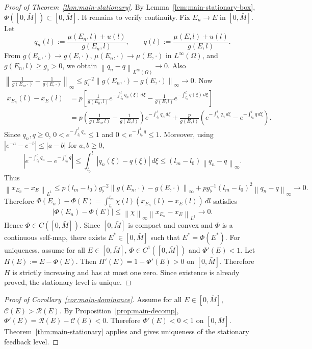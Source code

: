 \documentclass[pdflatex,sn-mathphys-num]{sn-jnl}
\theoremstyle{thmstyleone}
\theoremstyle{definition}
\theoremstyle{remark}
\newcommand{\Om}{\Omega}
\newcommand{\Rcal}{\mathcal{R}}
\newcommand{\Ccal}{\mathcal{C}}
\newcommand{\norm}[1]{\left\lVert#1\right\rVert}
\newcommand{\abs}[1]{\left\lvert#1\right\rvert}
\numberwithin{equation}{section}
\begin{document}
\begin{proof}[Proof of Theorem~\ref{thm:main-stationary}]
By Lemma~\ref{lem:main-stationary-box},
$\displaystyle 
\Phi([0,\bar M])\subset[0,\bar M]$.
It remains to verify continuity. Fix \(E_n\to E\) in \([0,\bar M]\). Let
\[
q_n(l):=\frac{\mu(E_n,l)+u(l)}{g(E_n,l)},
\qquad
q(l):=\frac{\mu(E,l)+u(l)}{g(E,l)} .
\]
From
$g(E_n,\cdot)\to g(E,\cdot)$,
$\mu(E_n,\cdot)\to\mu(E,\cdot)$ in $L^\infty(\Om)$,
and
$g(E_n,l)\ge g_\flat>0$,
we obtain
$\displaystyle 
\norm{q_n-q}_{L^\infty(\Om)}\to0$.
Also
$\displaystyle 
\left\|
\frac{1}{g(E_n,\cdot)}-\frac{1}{g(E,\cdot)}
\right\|_{\infty}
\le
g_\flat^{-2}
\norm{g(E_n,\cdot)-g(E,\cdot)}_{\infty}
\to0$.
Now
\[
\begin{aligned}
x_{E_n}(l)-x_E(l)
&=
p\left[
\frac{1}{g(E_n,l)}e^{-\int_{l_0}^{l}q_n(\xi)\,d\xi}
-
\frac{1}{g(E,l)}e^{-\int_{l_0}^{l}q(\xi)\,d\xi}
\right] \\[4pt]
&=
p\left(\frac{1}{g(E_n,l)}-\frac{1}{g(E,l)}\right)
e^{-\int_{l_0}^{l}q_n\,d\xi}
+
\frac{p}{g(E,l)}
\left(
e^{-\int_{l_0}^{l}q_n\,d\xi}
-
e^{-\int_{l_0}^{l}q\,d\xi}
\right).
\end{aligned}
\]
Since \(q_n,q\ge0\), $0<e^{-\int_{l_0}^{l}q_n}\le1$ and 
$0<e^{-\int_{l_0}^{l}q}\le1$.
Moreover, using \(|e^{-a}-e^{-b}|\le |a-b|\) for \(a,b\ge0\),
\[
\left|
e^{-\int_{l_0}^{l}q_n}
-
e^{-\int_{l_0}^{l}q}
\right|
\le
\int_{l_0}^{l}\abs{q_n(\xi)-q(\xi)}\,d\xi
\le
(l_m-l_0)\norm{q_n-q}_{\infty}.
\]
Thus
\[
\norm{x_{E_n}-x_E}_{L^1}
\le
p(l_m-l_0)
g_\flat^{-2}
\norm{g(E_n,\cdot)-g(E,\cdot)}_{\infty}
+
p g_\flat^{-1}(l_m-l_0)^2\norm{q_n-q}_{\infty}
\to0.
\]
Therefore
$\displaystyle
\Phi(E_n)-\Phi(E)
=
\int_{l_0}^{l_m}\chi(l)(x_{E_n}(l)-x_E(l))\,dl$
satisfies
\[
\abs{\Phi(E_n)-\Phi(E)}
\le
\norm{\chi}_{\infty}\norm{x_{E_n}-x_E}_{L^1}
\to0.
\]
Hence
$\displaystyle 
\Phi\in C([0,\bar M])$.
Since \([0,\bar M]\) is compact and convex and \(\Phi\) is a continuous self-map,
there exists \(E^*\in[0,\bar M]\) such that
$\displaystyle 
E^*=\Phi(E^*)$.
For uniqueness, assume for all $E\in[0,\bar M]$,
$\Phi\in C^1([0,\bar M])$ and
$\Phi'(E)<1$.
Let
$H(E):=E-\Phi(E)$.
Then $H'(E)=1-\Phi'(E)>0$ on $[0,\bar M]$. 
Therefore \(H\) is strictly increasing and has at most one zero. 
Since existence is already proved, the stationary level is unique.
\end{proof}
\begin{proof}[Proof of Corollary~\ref{cor:main-dominance}]
Assume for all $E\in[0,\bar M]$,
$\Ccal(E)>\Rcal(E)$.
By Proposition~\ref{prop:main-decomp},
$\displaystyle 
\Phi'(E)=\Rcal(E)-\Ccal(E)<0$.
Therefore $\Phi'(E)<0<1$ on $[0,\bar M]$.
Theorem~\ref{thm:main-stationary} applies and gives uniqueness of the stationary
feedback level.
\end{proof}
\end{document}
